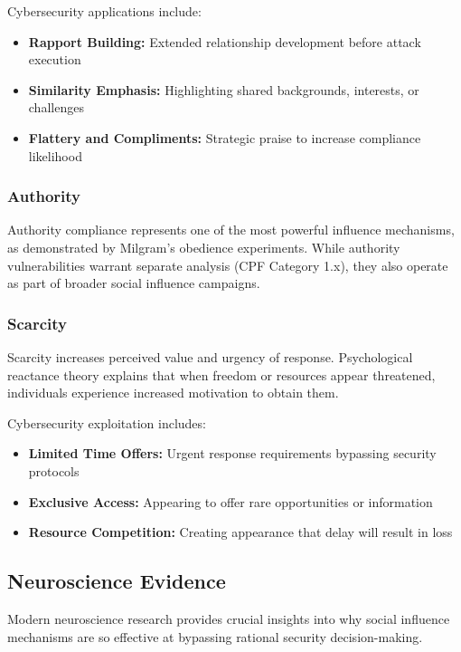 \documentclass[11pt,a4paper]{article}
\begin{document}
Cybersecurity applications include:

\begin{itemize}
\item \textbf{Rapport Building:} Extended relationship development before attack execution
\item \textbf{Similarity Emphasis:} Highlighting shared backgrounds, interests, or challenges
\item \textbf{Flattery and Compliments:} Strategic praise to increase compliance likelihood
\end{itemize}

\subsubsection{Authority}

Authority compliance represents one of the most powerful influence mechanisms, as demonstrated by Milgram's obedience experiments\cite{milgram1974}. While authority vulnerabilities warrant separate analysis (CPF Category 1.x), they also operate as part of broader social influence campaigns.

\subsubsection{Scarcity}

Scarcity increases perceived value and urgency of response. Psychological reactance theory\cite{brehm1966} explains that when freedom or resources appear threatened, individuals experience increased motivation to obtain them.

Cybersecurity exploitation includes:

\begin{itemize}
\item \textbf{Limited Time Offers:} Urgent response requirements bypassing security protocols
\item \textbf{Exclusive Access:} Appearing to offer rare opportunities or information
\item \textbf{Resource Competition:} Creating appearance that delay will result in loss
\end{itemize}

\subsection{Neuroscience Evidence}

Modern neuroscience research provides crucial insights into why social influence mechanisms are so effective at bypassing rational security decision-making.
\end{document}
